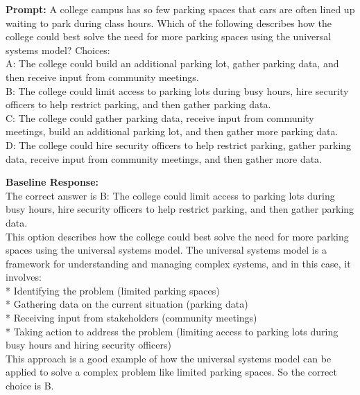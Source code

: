 \documentclass{article} %
\begin{document}
\begin{tcolorbox}[examplebox={Llama-3.2-1B-Instruct on ARC-c: incorrect baseline, correct steering}]
\textbf{Prompt:} A college campus has so few parking spaces that cars are often lined up waiting to park during class hours. Which of the following describes how the college could best solve the need for more parking spaces using the universal systems model? Choices:\\ \textcolor{incorrectcolor}{A: The college could build an additional parking lot, gather parking data, and then receive input from community meetings.}\\ \textcolor{incorrectcolor}{B: The college could limit access to parking lots during busy hours, hire security officers to help restrict parking, and then gather parking data.}\\ \textcolor{correctcolor}{C: The college could gather parking data, receive input from community meetings, build an additional parking lot, and then gather more parking data.}\\ \textcolor{incorrectcolor}{D: The college could hire security officers to help restrict parking, gather parking data, receive input from community meetings, and then gather more data.}

\vspace{0.5em}
\textbf{Baseline Response:}\\
The correct answer is B: The college could limit access to parking lots during busy hours, hire security officers to help restrict parking, and then gather parking data.\\This option describes how the college could best solve the need for more parking spaces using the universal systems model. The universal systems model is a framework for understanding and managing complex systems, and in this case, it involves:\\* Identifying the problem (limited parking spaces)\\* Gathering data on the current situation (parking data)\\* Receiving input from stakeholders (community meetings)\\* Taking action to address the problem (limiting access to parking lots during busy hours and hiring security officers)\\This approach is a good example of how the universal systems model can be applied to solve a complex problem like limited parking spaces. \textcolor{incorrectcolor}{So the correct choice is B}.


\end{tcolorbox}
\end{document}
